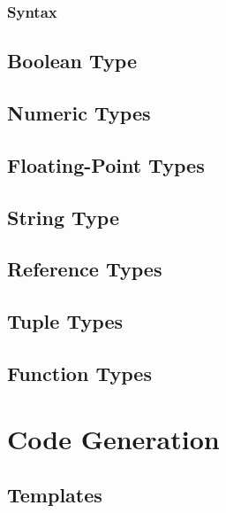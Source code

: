 \documentclass[a4paper,oneside,12pt, extrafontsizes]{memoir}
\begin{document}
    \section{Syntax}
    

  \chapter{Boolean Type}
  \label{ch:boolean}
  

  \chapter{Numeric Types}
  \label{ch:numeric-types}
  

  \chapter{Floating-Point Types}
  \label{ch:floating-point}
  

  \chapter{String Type}
  \label{ch:string}
  

  \chapter{Reference Types}
  \label{ch:concept-types}
  

  \chapter{Tuple Types}
  \label{ch:tuple-types}
  

  \chapter{Function Types}
  \label{ch:function-types}
  

\part{Code Generation}

  \chapter{Templates}
  \label{sec:templates}
\end{document}
